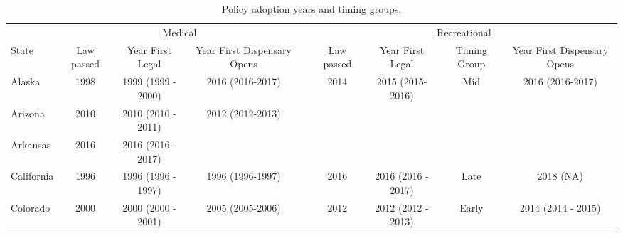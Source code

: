 \documentclass[12pt]{article}%
\begin{document}
\begin{appendices}
\begin{center}
\end{center}



\FloatBarrier


\begin{table}[htp!]
\caption{Policy adoption years and timing groups.}
\begin{adjustbox}{width=\textwidth}
\begin{tabular}{@{}lccclcccc@{}}
\toprule
              & \multicolumn{3}{c}{Medical}                                                                         &  & \multicolumn{4}{c}{Recreational}                                             \\ \cmidrule(lr){2-4} \cmidrule(l){6-9}
State         & Law passed & Year First Legal                           & Year First Dispensary Opens               &  & Law passed & Year First Legal   & Timing Group & Year First Dispensary Opens \\ \midrule \midrule
Alaska        & 1998       & 1999 (1999 - 2000)                         & 2016 (2016-2017)                          &  & 2014       & 2015 (2015-2016)   & Mid          & 2016 (2016-2017)            \\
Arizona       & 2010       & 2010 (2010 - 2011)                         & 2012 (2012-2013)                          &  &            &                    &              &                             \\
Arkansas      & 2016       & 2016 (2016 - 2017)                         &                                           &  &            &                    &              &                             \\
California    & 1996       & 1996 (1996 - 1997)                         & 1996 (1996-1997)                          &  & 2016       & 2016 (2016 - 2017) & Late         & 2018 (NA)                   \\
Colorado      & 2000       & 2000 (2000 - 2001)                         & 2005 (2005-2006)                          &  & 2012       & 2012 (2012 - 2013) & Early        & 2014 (2014 - 2015)          \\

\end{tabular}
\end{adjustbox}
\end{table}
\end{appendices}
\end{document}
